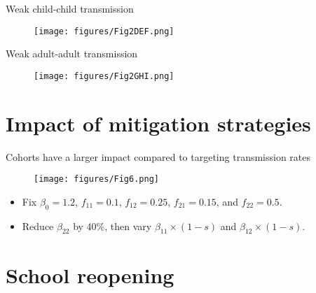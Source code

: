 \documentclass[8pt]{beamer}
\begin{document}
\begin{frame}{Weak child-child transmission}
\begin{figure}
    \centering
    \texttt{[image: figures/Fig2DEF.png]}
\end{figure}
\end{frame}

\begin{frame}{Weak adult-adult transmission}
\begin{figure}
    \centering
    \texttt{[image: figures/Fig2GHI.png]}
\end{figure}
\end{frame}

\section{Impact of mitigation strategies}

\begin{frame}{Cohorts have a larger impact compared to targeting transmission rates}
\begin{figure}
    \centering
    \texttt{[image: figures/Fig6.png]}
\end{figure}
\begin{itemize}
    \item Fix $\beta_{0} = 1.2$, $f_{11} = 0.1$, $f_{12} = 0.25$, $f_{21} = 0.15$, and $f_{22} = 0.5$.
    \item Reduce $\beta_{22}$ by 40\%, then vary $\beta_{11} \times (1-s)$ and $\beta_{12} \times (1-s)$.
\end{itemize}
\end{frame}

\section{School reopening}
\end{document}
